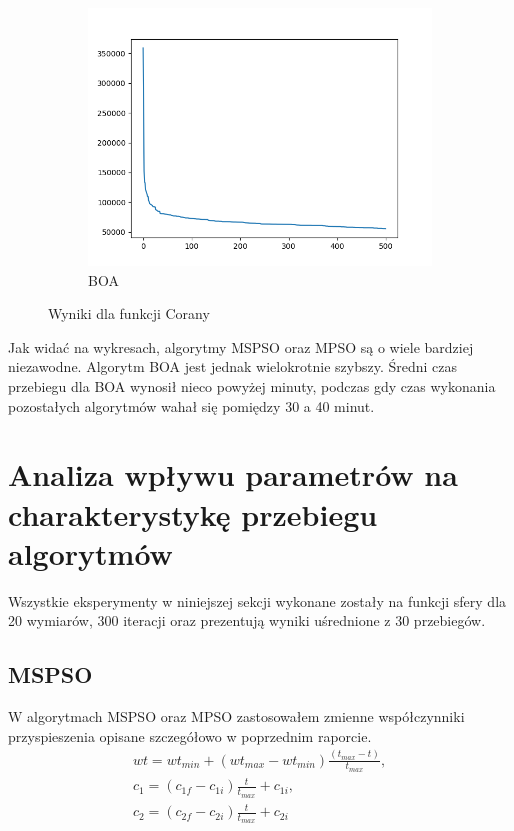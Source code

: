 \documentclass[12pt]{article}
\begin{document}
\begin{figure}[H]
\begin{subfigure}{0.32\textwidth}
        \includegraphics[width=\linewidth]{plots/BOA/corana.png}
        \caption{BOA}
    \end{subfigure}
    \caption{Wyniki dla funkcji Corany}
\end{figure}
Jak widać na wykresach, algorytmy MSPSO oraz MPSO są o wiele bardziej niezawodne. Algorytm BOA jest jednak wielokrotnie szybszy. Średni czas przebiegu dla BOA wynosił nieco powyżej minuty, podczas gdy czas wykonania pozostałych algorytmów wahał się pomiędzy 30 a 40 minut.

\section{Analiza wpływu parametrów na charakterystykę przebiegu algorytmów}
Wszystkie eksperymenty w niniejszej sekcji wykonane zostały na funkcji sfery dla 20 wymiarów, 300 iteracji oraz prezentują wyniki uśrednione z 30 przebiegów.

\subsection{MSPSO}
W algorytmach MSPSO oraz MPSO zastosowałem zmienne współczynniki przyspieszenia opisane szczegółowo w poprzednim raporcie.
\begin{gather}
    wt = wt_{min} + (wt_{max} - wt_{min})\frac{(t_{max} - t)}{t_{max}},\\
    c_1 = (c_{1f} - c_{1i})\frac{t}{t_{max}} + c_{1i},\\
    c_2 = (c_{2f} - c_{2i})\frac{t}{t_{max}} + c_{2i}
\end{gather}
\end{document}
